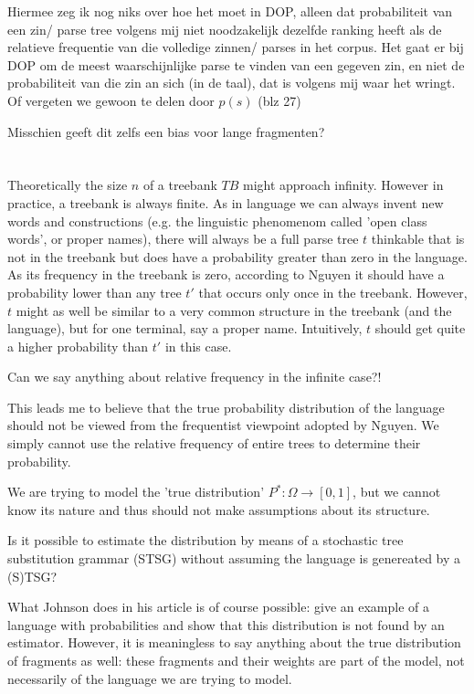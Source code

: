 \documentclass{article}
\begin{document}
Hiermee zeg ik nog niks over hoe het moet in DOP, alleen dat probabiliteit van een zin/ parse tree volgens mij niet noodzakelijk dezelfde ranking heeft als de relatieve frequentie van die volledige zinnen/ parses in het corpus. 
Het gaat er bij DOP om de meest waarschijnlijke parse te vinden van een gegeven zin, en niet de probabiliteit van die zin an sich (in de taal), dat is volgens mij waar het wringt. Of vergeten we gewoon te delen door $p(s)$ (blz 27)


Misschien geeft dit zelfs een bias voor lange fragmenten?

\section{}
 Theoretically the size $n$ of a treebank $TB$ might approach infinity. However in practice, a treebank is always finite. %
As in language we can always invent new words and constructions (e.g. the linguistic phenomenom called 'open class words', or proper names), there will always be a full parse tree $t$ thinkable that is not in the treebank but does have a probability greater than zero in the language. As its frequency in the treebank is zero, according to Nguyen it should have a probability lower than any tree $t'$ that occurs only once in the treebank. However, $t$ might as well be similar to a very common structure in the treebank (and the language), but for one terminal, say a proper name. Intuitively, $t$ should get quite a higher probability than $t'$ in this case. 

Can we say anything about relative frequency in the infinite case?!

This leads me to believe that the true probability distribution of the language should not be viewed from the frequentist viewpoint adopted by Nguyen. We simply cannot use the relative frequency of entire trees to determine their probability.



We are trying to model the 'true distribution' $P^*:\Omega\rightarrow [0,1]$, but we cannot know its nature and thus should not make assumptions about its structure. 

Is it possible to estimate the distribution by means of a stochastic tree substitution grammar (STSG) without assuming the language is genereated by a (S)TSG?

What Johnson does in his article is of course possible: give an example of a language with probabilities and show that this distribution is not found by an estimator. However, it is meaningless to say anything about the true distribution of fragments as well: these fragments and their weights are part of the model, not necessarily of the language we are trying to model. 
\end{document}
